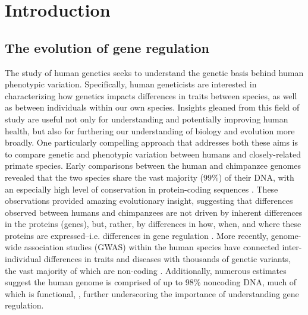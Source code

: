 \chapter{Introduction}

\section{The evolution of gene regulation}

The study of human genetics seeks to understand the genetic basis behind human phenotypic variation. Specifically, human geneticists are interested in characterizing how genetics impacts differences in traits between species, as well as between individuals within our own species. Insights gleaned from this field of study are useful not only for understanding and potentially improving human health, but also for furthering our understanding of biology and evolution more broadly. One particularly compelling approach that addresses both these aims is to compare genetic and phenotypic variation between humans and closely-related primate species. Early comparisons between the human and chimpanzee genomes revealed that the two species share the vast majority (99\%) of their DNA, with an especially high level of conservation in protein-coding sequences \cite{King.1975, Prado-Martinez.2013, Waterson.2005}. These observations provided amazing evolutionary insight, suggesting that differences observed between humans and chimpanzees are not driven by inherent differences in the proteins (genes), but, rather, by differences in how, when, and where these proteins are expressed--i.e. differences in gene regulation \cite{King.1975}. More recently, genome-wide association studies (GWAS) within the human species have connected inter-individual differences in traits and diseases with thousands of genetic variants, the vast majority of which are non-coding \cite{Edwards.2013, Gloss.2018}. Additionally, numerous estimates suggest the human genome is comprised of up to 98\% noncoding DNA, much of which is functional, \cite{Pennacchio.2013, Comfort.2015, Kellis.2014, Lander.2001, Little.2005}, further underscoring the importance of understanding gene regulation.

